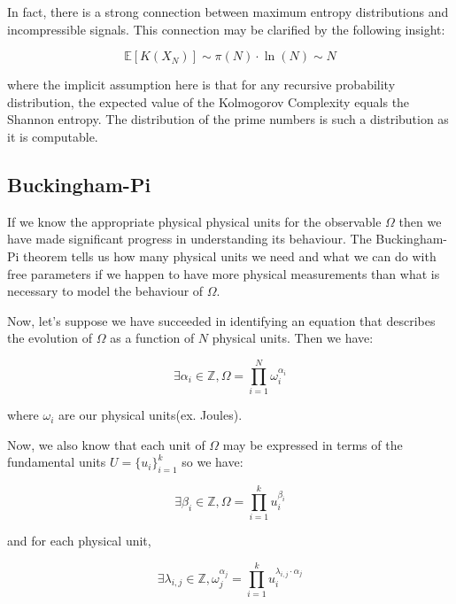 \documentclass{article}
\begin{document}
In fact, there is a strong connection between maximum entropy distributions and incompressible signals. This connection may be clarified by the following insight: 

\begin{equation}
\mathbb{E}[K(X_N)] \sim \pi(N) \cdot \ln(N) \sim N \tag{6}
\end{equation}

where the implicit assumption here is that for any recursive probability distribution, the expected value of the Kolmogorov Complexity equals the Shannon entropy. The distribution of the prime numbers is such a distribution as it
is computable.

\newpage 

\subsection{Buckingham-Pi}

If we know the appropriate physical physical units for the observable $\Omega$ then we have made significant
progress in understanding its behaviour. The Buckingham-Pi theorem tells us how many physical units we need
and what we can do with free parameters if we happen to have more physical measurements than what is necessary
to model the behaviour of $\Omega$.

Now, let's suppose we have succeeded in identifying an equation that describes the evolution of $\Omega$ as a function
of $N$ physical units. Then we have:

\begin{equation}
\exists \alpha_i \in \mathbb{Z}, \Omega = \prod_{i=1}^N \omega_i^{\alpha_i} \tag{1}
\end{equation}

where $\omega_i$ are our physical units(ex. Joules).

Now, we also know that each unit of $\Omega$ may be expressed in terms of the fundamental units $U = \{u_i\}_{i=1}^k$
so we have:

\begin{equation}
\exists \beta_i \in \mathbb{Z}, \Omega = \prod_{i=1}^k u_i^{\beta_i} \tag{2}
\end{equation}

and for each physical unit,

\begin{equation}
\exists \lambda_{i,j} \in \mathbb{Z}, \omega_j^{\alpha_j} = \prod_{i=1}^k u_i^{\lambda_{i,j} \cdot \alpha_j} \tag{3}
\end{equation}
\end{document}
